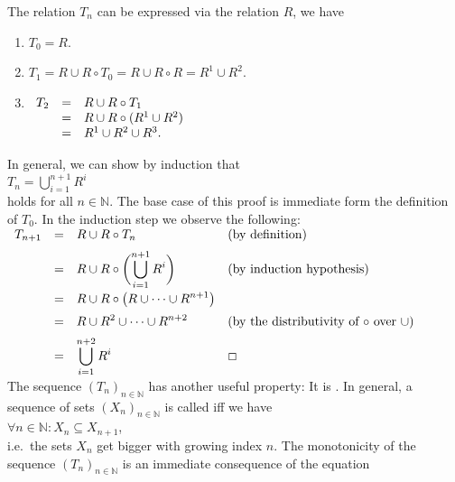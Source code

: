 The relation  $T_n$ can be expressed via the relation $R$, we have
\begin{enumerate}
\item $T_0 = R$.
\item $T_1 = R \cup R \circ T_0 = R \cup R \circ R = R^1 \cup R^2$.
\item$\begin{array}[t]{lcl}
       T_2  & = & R \cup R \circ T_1 \\
            & = & R \cup R \circ (R^1 \cup R^2) \\
            & = & R^1 \cup R^2 \cup R^3. \\
       \end{array}
      $
\end{enumerate}
In general, we can show by induction that
\\[0.2cm]
\hspace*{1.3cm}
$T_n = \bigcup\limits_{i=1}^{n+1} R^i$
\\[0.2cm]
holds for all $n \in \mathbb{N}$.  The base case of this proof is immediate form the definition of $T_0$.
In the induction step we observe the following:
\\[0.2cm]
\hspace*{1.3cm}
$
 \begin{array}{lcll}
   T_{n+1} & = & \displaystyle R \cup R \circ T_n & \mbox{(by definition)} \\[0.2cm]
           & = & \displaystyle R \cup R \circ \biggl(\bigcup\limits_{i=1}^{n+1} R^i\biggr) &
                 \mbox{(by induction hypothesis)} \\[0.4cm]
           & = & \displaystyle R \cup R \circ \left(R \cup \cdots \cup R^{n+1}\right) \\[0.2cm] 
           & = & \displaystyle R \cup R^2 \cup \cdots \cup R^{n+2}  &
                 \mbox{(by the distributivity of $\circ$ over $\cup$)} \\[0.2cm]
           & = & \displaystyle \bigcup\limits_{i=1}^{n+2} R^i & \Box 
   \end{array}
$
\\[0.2cm]
The sequence $(T_n)_{n\in\mathbb{N}}$ has another useful property:  It is 
.  In general, a sequence of sets $(X_n)_{n\in\mathbb{N}}$ is called
 iff we have
\\[0.2cm]
\hspace*{1.3cm}
$\forall n \in \mathbb{N}: X_n \subseteq X_{n+1}$,
\\[0.2cm]
i.e.~the sets $X_n$ get bigger with growing index $n$.
The monotonicity of the sequence  $(T_n)_{n \in \mathbb{N}}$ is an immediate consequence of the equation
